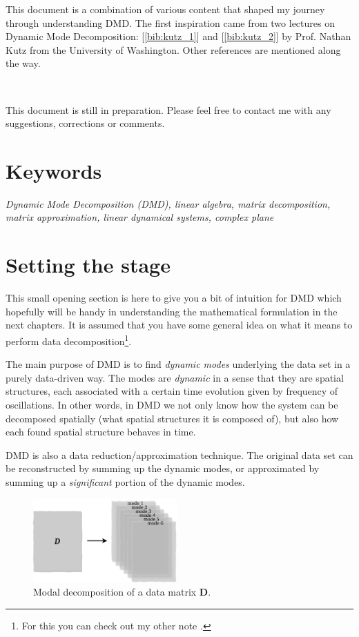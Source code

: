 \documentclass[10pt,twocolumn]{article}
\begin{document}
This document is a combination of various content that shaped my journey through understanding DMD. The first inspiration came from two lectures on Dynamic Mode Decomposition: [\ref{bib:kutz_1}] and [\ref{bib:kutz_2}] by Prof. Nathan Kutz from the University of Washington. Other references are mentioned along the way.

\,\,

This document is still in preparation. Please feel free to contact me with any suggestions, corrections or comments.

\section*{Keywords}

\textit{Dynamic Mode Decomposition (DMD), linear algebra, matrix decomposition, matrix approximation, linear dynamical systems, complex plane}



\tableofcontents


\section{Setting the stage}

This small opening section is here to give you a bit of intuition for DMD which hopefully will be handy in understanding the mathematical formulation in the next chapters. It is assumed that you have some general idea on what it means to perform data decomposition\footnote{For this you can check out my other note \cite{Zdybal_data_dec}.}.

The main purpose of DMD is to find \textit{dynamic modes} underlying the data set in a purely data-driven way. The modes are \textit{dynamic} in a sense that they are spatial structures, each associated with a certain time evolution given by frequency of oscillations. In other words, in DMD we not only know how the system can be decomposed spatially (what spatial structures it is composed of), but also how each found spatial structure behaves in time.

DMD is also a data reduction/approximation technique. The original data set can be reconstructed by summing up the dynamic modes, or approximated by summing up a \textit{significant} portion of the dynamic modes.

\begin{figure}[H]
\centering\includegraphics[width=5.5cm]{DMD-modal-decomposition.png}
\caption{Modal decomposition of a data matrix $\mathbf{D}$.}
\label{fig:modal-decomposition}
\end{figure}
\end{document}
